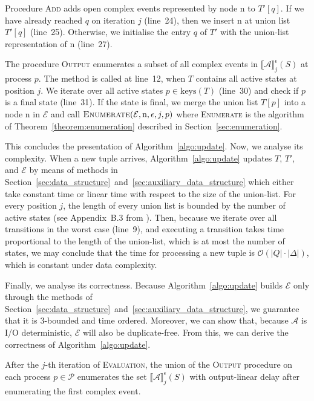 Procedure \textsc{Add} adds open complex events represented by node \textrm{n} to $T'[q]$. If we have already reached $q$ on iteration $j$ (line~24), then we insert \textrm{n} at union list $T'[q]$ (line~25). Otherwise,  we initialise the entry $q$ of $T'$ with the union-list representation of \textrm{n} (line~27).

The procedure \textsc{Output} enumerates a subset of all complex events in ${\llbracket \mathcal{A} \rrbracket}^{\epsilon}_{j}(S)$ at process $p$. The method is called at line~12, when $T$ contains all active states at position $j$. We iterate over all active states $p \in \text{keys}(T)$ (line~30) and check if $p$ is a final state (line~31). If the state is final, we merge the union list $T[p]$ into a node \textrm{n} in $\mathcal{E}$ and call $\textsc{Enumerate}(\mathcal{E}, \textrm{n}, \epsilon, j, p)$ where \textsc{Enumerate} is the algorithm of Theorem~\ref{theorem:enumeration} described in Section~\ref{sec:enumeration}.

This concludes the presentation of Algorithm~\ref{algo:update}. Now, we analyse its complexity. When a new tuple arrives, Algorithm~\ref{algo:update} updates $T$, $T'$, and $\mathcal{E}$ by means of methods in Section~\ref{sec:data_structure}~and~\ref{sec:auxiliary_data_structure} which either take constant time or linear time with respect to the size of the union-list. For every position $j$, the length of every union list is bounded by the number of active states (see Appendix~B.3 from \cite{core}). Then, because we iterate over all transitions in the worst case (line~9), and executing a transition takes time proportional to the length of the union-list, which is at most the number of states, we may conclude that the time for processing a new tuple is $\mathcal{O}(|Q| \cdot |\Delta|)$, which is constant under data complexity.

Finally, we analyse its correctness. Because Algorithm~\ref{algo:update} builds $\mathcal{E}$ only through the methods of Section~\ref{sec:data_structure}~and~\ref{sec:auxiliary_data_structure}, we guarantee that it is $3$-bounded and time ordered. Moreover, we can show that, because $\mathcal{A}$ is I/O deterministic, $\mathcal{E}$ will also be duplicate-free. From this, we can derive the correctness of Algorithm~\ref{algo:update}.

\begin{theorem}\label{theorem:cea}
  After the $j$-th iteration of \textsc{Evaluation}, the union of the \textsc{Output} procedure on each process $p \in \mathcal{P}$ enumerates the set ${\llbracket \mathcal{A} \rrbracket}^{\epsilon}_{j}(S)$ with output-linear delay after enumerating the first complex event.
\end{theorem}

